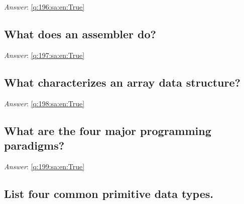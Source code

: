 \documentclass[a4paper,11pt,oneside]{article}
\begin{document}
\begin{sloppypar}
\textit{Answer}: \autoref{q:196:sa:en:True}



\subsection{What does an assembler do?}

\label{q:197:sa:en:False}

\vspace{2cm}

\noindent\makebox[\textwidth]{\hrulefill}

\vspace{1cm}

\textit{Answer}: \autoref{q:197:sa:en:True}



\subsection{What characterizes an array data structure?}

\label{q:198:sa:en:False}

\vspace{2cm}

\noindent\makebox[\textwidth]{\hrulefill}

\vspace{1cm}

\textit{Answer}: \autoref{q:198:sa:en:True}



\subsection{What are the four major programming paradigms?}

\label{q:199:sa:en:False}

\vspace{2cm}

\noindent\makebox[\textwidth]{\hrulefill}

\vspace{1cm}

\textit{Answer}: \autoref{q:199:sa:en:True}



\subsection{List four common primitive data types.}

\label{q:200:sa:en:False}


\end{sloppypar}
\end{document}
